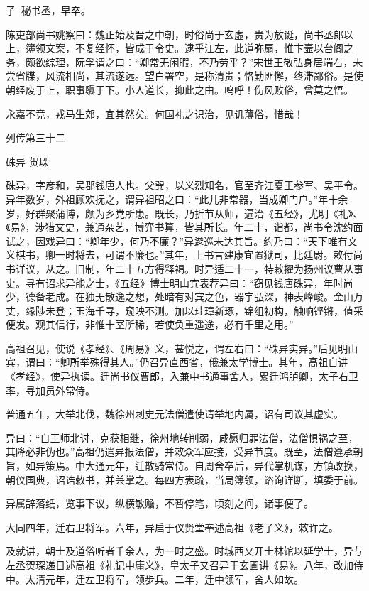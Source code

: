 \documentclass[12pt,UTF8]{ctexbook}
\begin{document}
子，秘书丞，早卒。

陈吏部尚书姚察曰：魏正始及晋之中朝，时俗尚于玄虚，贵为放诞，尚书丞郎以上，簿领文案，不复经怀，皆成于令史。逮乎江左，此道弥扇，惟卞壸以台阁之务，颇欲综理，阮孚谓之曰：“卿常无闲暇，不乃劳乎？”宋世王敬弘身居端右，未尝省牒，风流相尚，其流遂远。望白署空，是称清贵；恪勤匪懈，终滞鄙俗。是使朝经废于上，职事隳于下。小人道长，抑此之由。呜呼！伤风败俗，曾莫之悟。

永嘉不竞，戎马生郊，宜其然矣。何国礼之识治，见讥薄俗，惜哉！





列传第三十二

硃异 贺琛

硃异，字彦和，吴郡钱唐人也。父巽，以义烈知名，官至齐江夏王参军、吴平令。异年数岁，外祖顾欢抚之，谓异祖昭之曰：“此儿非常器，当成卿门户。”年十余岁，好群聚蒲博，颇为乡党所患。既长，乃折节从师，遍治《五经》，尤明《礼》、《易》，涉猎文史，兼通杂艺，博弈书算，皆其所长。年二十，诣都，尚书令沈约面试之，因戏异曰：“卿年少，何乃不廉？”异逡巡未达其旨。约乃曰：“天下唯有文义棋书，卿一时将去，可谓不廉也。”其年，上书言建康宜置狱司，比廷尉。敕付尚书详议，从之。旧制，年二十五方得释褐。时异适二十一，特敕擢为扬州议曹从事史。寻有诏求异能之士，《五经》博士明山宾表荐异曰：“窃见钱唐硃异，年时尚少，德备老成。在独无散逸之想，处暗有对宾之色，器宇弘深，神表峰峻。金山万丈，缘陟未登；玉海千寻，窥映不测。加以珪璋新琢，锦组初构，触响铿锵，值采便发。观其信行，非惟十室所稀，若使负重遥途，必有千里之用。”

高祖召见，使说《孝经》、《周易》义，甚悦之，谓左右曰：“硃异实异。”后见明山宾，谓曰：“卿所举殊得其人。”仍召异直西省，俄兼太学博士。其年，高祖自讲《孝经》，使异执读。迁尚书仪曹郎，入兼中书通事舍人，累迁鸿胪卿，太子右卫率，寻加员外常侍。

普通五年，大举北伐，魏徐州刺史元法僧遣使请举地内属，诏有司议其虚实。

异曰：“自王师北讨，克获相继，徐州地转削弱，咸愿归罪法僧，法僧惧祸之至，其降必非伪也。”高祖仍遣异报法僧，并敕众军应接，受异节度。既至，法僧遵承朝旨，如异策焉。中大通元年，迁散骑常侍。自周舍卒后，异代掌机谋，方镇改换，朝仪国典，诏诰敕书，并兼掌之。每四方表疏，当局簿领，谘询详断，填委于前。

异属辞落纸，览事下议，纵横敏赡，不暂停笔，顷刻之间，诸事便了。

大同四年，迁右卫将军。六年，异启于仪贤堂奉述高祖《老子义》，敕许之。

及就讲，朝士及道俗听者千余人，为一时之盛。时城西又开士林馆以延学士，异与左丞贺琛递日述高祖《礼记中庸义》，皇太子又召异于玄圃讲《易》。八年，改加侍中。太清元年，迁左卫将军，领步兵。二年，迁中领军，舍人如故。
\end{document}
